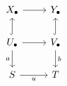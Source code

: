 \documentclass[crop,dvisvgm]{standalone}
\begin{document}
\[\begin {tikzcd}
      X_\bullet 
        \ar [r]
      & Y_\bullet 
    \\U_\bullet 
        \ar [r]
        \ar [u,hook]
        \ar [d,swap,"a"]
      & V_\bullet 
        \ar [u,hook]
        \ar [d,"b"]
    \\S \ar [r,swap,"u"]
      & T
    \end {tikzcd}\]
\end{document}
